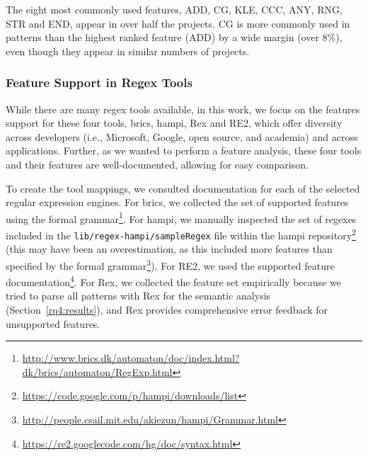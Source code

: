 The eight most commonly used features, ADD, CG, KLE, CCC, ANY, RNG, STR and END,
appear in over half the projects. %
CG is more commonly used in patterns than the highest ranked feature (ADD) by a wide margin (over 8\%), even though they appear in similar numbers of projects.

\subsubsection{Feature Support in Regex Tools}
\label{regextoolsresults}
While there are many regex tools available, in this work, we focus on the features support for these four tools, brics, hampi, Rex and RE2, which offer diversity across developers (i.e., Microsoft, Google, open source, and academia) and across applications. Further, as we wanted to perform a feature analysis, these four tools and their features are well-documented, allowing for easy comparison.

To create the tool mappings, we consulted documentation for each of the selected regular expression engines. For brics, we collected the set of supported features using the formal grammar\footnote{\url{http://www.brics.dk/automaton/doc/index.html?dk/brics/automaton/RegExp.html}}.  For hampi, we manually inspected the set of regexes included in the {\tt lib/regex-hampi/sampleRegex} file within the hampi repository\footnote{\url{https://code.google.com/p/hampi/downloads/list}} (this may have been an overestimation, as this included more features than specified by the formal grammar\footnote{\url{http://people.csail.mit.edu/akiezun/hampi/Grammar.html}}).  For RE2, we used the  supported feature documentation\footnote{\url{https://re2.googlecode.com/hg/doc/syntax.html}}.  For Rex, we collected the feature set empirically because we tried to parse all patterns with Rex for the semantic analysis (Section~\ref{rq4:results}), and Rex provides comprehensive error feedback for unsupported features.



